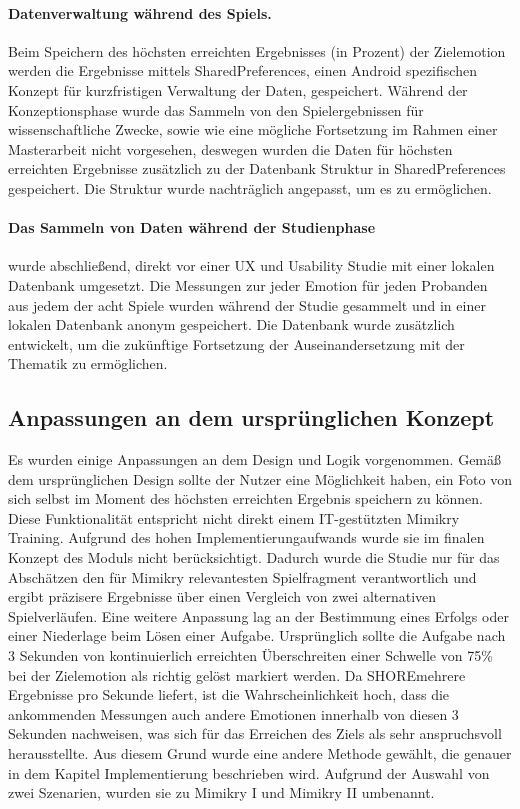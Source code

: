 \paragraph{Datenverwaltung während des Spiels.}Beim Speichern des höchsten erreichten Ergebnisses (in Prozent) der Zielemotion werden die Ergebnisse mittels SharedPreferences, einen Android spezifischen Konzept für kurzfristigen Verwaltung der Daten, gespeichert. Während der Konzeptionsphase wurde das Sammeln von den Spielergebnissen für wissenschaftliche Zwecke, sowie wie eine mögliche Fortsetzung im Rahmen einer Masterarbeit nicht vorgesehen, deswegen wurden die Daten für höchsten erreichten Ergebnisse zusätzlich zu der Datenbank Struktur in SharedPreferences gespeichert. Die Struktur wurde nachträglich angepasst, um es zu ermöglichen.

\paragraph{Das Sammeln von Daten während der Studienphase} wurde abschließend, direkt vor einer UX und Usability Studie mit einer lokalen Datenbank umgesetzt. Die Messungen zur jeder Emotion für jeden Probanden aus jedem der acht Spiele wurden während der Studie gesammelt und in einer lokalen Datenbank anonym gespeichert. Die Datenbank wurde zusätzlich entwickelt, um die zukünftige Fortsetzung der Auseinandersetzung mit der Thematik zu ermöglichen.

\subsection{Anpassungen an dem ursprünglichen Konzept}
Es wurden einige Anpassungen an dem Design und Logik vorgenommen. Gemäß dem ursprünglichen Design sollte der Nutzer eine Möglichkeit haben, ein Foto von sich selbst im Moment des höchsten erreichten Ergebnis speichern zu können. Diese Funktionalität entspricht nicht direkt einem IT-gestützten Mimikry Training. Aufgrund des hohen Implementierungaufwands wurde sie im finalen Konzept des Moduls nicht berücksichtigt. Dadurch wurde die Studie nur für das Abschätzen den für Mimikry relevantesten Spielfragment verantwortlich und ergibt präzisere Ergebnisse über einen Vergleich von zwei alternativen Spielverläufen.
Eine weitere Anpassung lag an der Bestimmung eines Erfolgs oder einer Niederlage beim Lösen einer Aufgabe. Ursprünglich sollte die Aufgabe nach 3 Sekunden von kontinuierlich erreichten Überschreiten einer Schwelle von 75\% bei der Zielemotion als richtig gelöst markiert werden. Da SHORE\re mehrere Ergebnisse pro Sekunde liefert, ist die Wahrscheinlichkeit hoch, dass die ankommenden Messungen auch andere Emotionen innerhalb von diesen 3 Sekunden nachweisen, was sich für das Erreichen des Ziels als sehr anspruchsvoll herausstellte. Aus diesem Grund wurde eine andere Methode gewählt, die genauer in dem Kapitel Implementierung beschrieben wird.
Aufgrund der Auswahl von zwei Szenarien, wurden sie zu Mimikry I und Mimikry II umbenannt.


